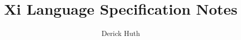 \documentclass{article}
\begin{document}
\title{Xi Language Specification Notes}
\author{Derick Huth}
\maketitle





\end{document}
